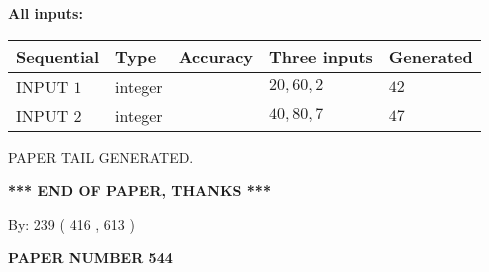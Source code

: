 \documentclass[12pt]{article}
\begin{document}
   
   
   
\noindent{}
   
   
   
   
\noindent\vspace{0.1in}\hspace{-0.08in} {\textbf{\Large{All inputs: }}}
   
   
  
  
\noindent\begin{tabular}{|l|l|l|l|l|}
\hline
 Sequential & Type & Accuracy & Three inputs & Generated \\ 
\hline
 
 
  INPUT $  1 $ & integer &  & $
 20
 , 
 60
 , 
 2
 $ & $ 42 $ 
 \\  \hline  
 
 
  INPUT $  2 $ & integer &  & $
 40
 , 
 80
 , 
 7
 $ & $ 47 $ 
 \\  \hline  
 \end{tabular}
   
   
   
   
   
   
 \vspace{0.2in}
 
   
   
\vspace{2.0in} PAPER TAIL GENERATED.
   
   
   
   
\vspace{1.0in} 
{\textbf{\large{ *** END OF PAPER, THANKS *** }}} 
   
   
\hspace{1.0in} By: 
 239 ( 416 ,  613 )
   
   
   
   
\newpage 
\setcounter{page}{ 
   544001 } 
   
   
   
   
 {\textbf{ \Large{ PAPER NUMBER  544  }}}
   
   
\vspace{0.2in}
   
   
   
   
   
   
   
   
 \vspace{0.2in}
 
 
 
\end{document}
